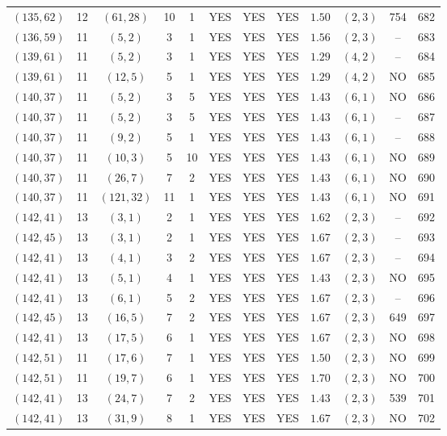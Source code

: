 \begin{longtable}{|c|c|c|c|c|c|c|c|c|c|c|c|}
$(135,62)$ & 12 & $(61,28)$ & 10 & 1 & YES & YES & YES & $1.50$ & $(2,3)$ & 754 & 682\\
$(136,59)$ & 11 & $(5,2)$ & 3 & 1 & YES & YES & YES & $1.56$ & $(2,3)$ & -- & 683\\
$(139,61)$ & 11 & $(5,2)$ & 3 & 1 & YES & YES & YES & $1.29$ & $(4,2)$ & -- & 684\\
$(139,61)$ & 11 & $(12,5)$ & 5 & 1 & YES & YES & YES & $1.29$ & $(4,2)$ & NO & 685\\
$(140,37)$ & 11 & $(5,2)$ & 3 & 5 & YES & YES & YES & $1.43$ & $(6,1)$ & NO & 686\\
$(140,37)$ & 11 & $(5,2)$ & 3 & 5 & YES & YES & YES & $1.43$ & $(6,1)$ & -- & 687\\
$(140,37)$ & 11 & $(9,2)$ & 5 & 1 & YES & YES & YES & $1.43$ & $(6,1)$ & -- & 688\\
$(140,37)$ & 11 & $(10,3)$ & 5 & 10 & YES & YES & YES & $1.43$ & $(6,1)$ & NO & 689\\
$(140,37)$ & 11 & $(26,7)$ & 7 & 2 & YES & YES & YES & $1.43$ & $(6,1)$ & NO & 690\\
$(140,37)$ & 11 & $(121,32)$ & 11 & 1 & YES & YES & YES & $1.43$ & $(6,1)$ & NO & 691\\
$(142,41)$ & 13 & $(3,1)$ & 2 & 1 & YES & YES & YES & $1.62$ & $(2,3)$ & -- & 692\\
$(142,45)$ & 13 & $(3,1)$ & 2 & 1 & YES & YES & YES & $1.67$ & $(2,3)$ & -- & 693\\
$(142,41)$ & 13 & $(4,1)$ & 3 & 2 & YES & YES & YES & $1.67$ & $(2,3)$ & -- & 694\\
$(142,41)$ & 13 & $(5,1)$ & 4 & 1 & YES & YES & YES & $1.43$ & $(2,3)$ & NO & 695\\
$(142,41)$ & 13 & $(6,1)$ & 5 & 2 & YES & YES & YES & $1.67$ & $(2,3)$ & -- & 696\\
$(142,45)$ & 13 & $(16,5)$ & 7 & 2 & YES & YES & YES & $1.67$ & $(2,3)$ & 649 & 697\\
$(142,41)$ & 13 & $(17,5)$ & 6 & 1 & YES & YES & YES & $1.67$ & $(2,3)$ & NO & 698\\
$(142,51)$ & 11 & $(17,6)$ & 7 & 1 & YES & YES & YES & $1.50$ & $(2,3)$ & NO & 699\\
$(142,51)$ & 11 & $(19,7)$ & 6 & 1 & YES & YES & YES & $1.70$ & $(2,3)$ & NO & 700\\
$(142,41)$ & 13 & $(24,7)$ & 7 & 2 & YES & YES & YES & $1.43$ & $(2,3)$ & 539 & 701\\
$(142,41)$ & 13 & $(31,9)$ & 8 & 1 & YES & YES & YES & $1.67$ & $(2,3)$ & NO & 702\\

\end{longtable}
